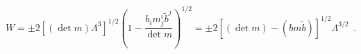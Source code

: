 \begin{equation}
  W = \pm 2 [(\det m)\Lambda^{3}]^{1/2}
  \left(1 - \frac{b_i m^i_{j} \tilde{b}^{{j}}}
    {\det m}\right)^{1/2}
  = \pm 2 \left[ (\det m) - (bm{\tilde b})
  \right]^{1/2} \Lambda^{3/2}~~.
\label{u2ft}
\end{equation}

